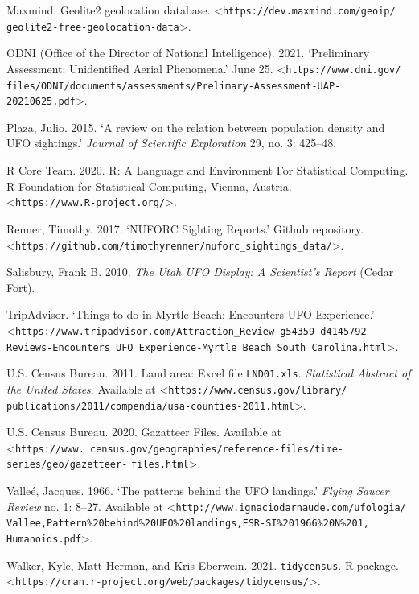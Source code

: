 \documentclass[]{elsarticle} %
\begin{document}
Maxmind. Geolite2 geolocation database.
\textless{}\texttt{https://dev.maxmind.com/geoip/}
\texttt{geolite2-free-geolocation-data}\textgreater.

ODNI (Office of the Director of National Intelligence). 2021.
`Preliminary Assessment: Unidentified Aerial Phenomena.' June 25.
\textless{}\texttt{https://www.dni.gov/}
\texttt{files/ODNI/documents/assessments/Prelimary-Assessment-UAP-}
\texttt{20210625.pdf}\textgreater.

Plaza, Julio. 2015. `A review on the relation between population density
and UFO sightings.' \emph{Journal of Scientific Exploration} 29, no. 3:
425--48.

R Core Team. 2020. R: A Language and Environment For Statistical
Computing. R Foundation for Statistical Computing, Vienna, Austria.\\
\textless{}\texttt{https://www.R-project.org/}\textgreater.

Renner, Timothy. 2017. `NUFORC Sighting Reports.' Github repository.
\textless{}\texttt{https://github.com/timothyrenner/nuforc\_sightings\_data/}\textgreater.

Salisbury, Frank B. 2010. \emph{The Utah UFO Display: A Scientist's
Report} (Cedar Fort).

TripAdvisor. `Things to do in Myrtle Beach: Encounters UFO Experience.'
\textless{}\texttt{https://www.tripadvisor.com/Attraction\_Review-g54359-d4145792-}\\
\texttt{Reviews-Encounters\_UFO\_Experience-Myrtle\_Beach\_South\_Carolina.html}\textgreater.

U.S. Census Bureau. 2011. Land area: Excel file \texttt{LND01.xls}.
\emph{Statistical Abstract of the United States}. Available at
\textless{}\texttt{https://www.census.gov/library/}
\texttt{publications/2011/compendia/usa-counties-2011.html}\textgreater.

U.S. Census Bureau. 2020. Gazatteer Files. Available at
\textless{}\texttt{https://www.\ census.gov/geographies/reference-files/time-series/geo/gazetteer-}
\texttt{files.html}\textgreater.

Valleé, Jacques. 1966. `The patterns behind the UFO landings.'
\emph{Flying Saucer Review} no. 1: 8--27. Available at
\textless{}\texttt{http://www.ignaciodarnaude.com/ufologia/}
\texttt{Vallee,Pattern\%20behind\%20UFO\%20landings,FSR-SI\%201966\%20N\%201,}
\texttt{Humanoids.pdf}\textgreater.

Walker, Kyle, Matt Herman, and Kris Eberwein. 2021. \texttt{tidycensus}.
R package.
\textless{}\texttt{https://cran.r-project.org/web/packages/tidycensus/}\textgreater.
\end{document}
